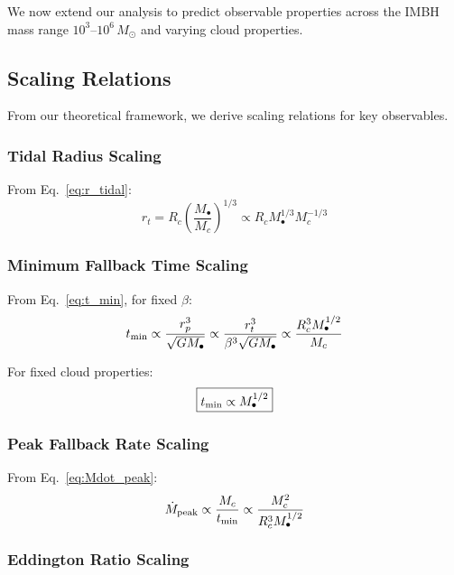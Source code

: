 \documentclass[twocolumn,amsmath,amssymb,prd,superscriptaddress,nofootinbib]{revtex4-2}
\begin{document}
We now extend our analysis to predict observable properties across the IMBH mass range $10^3$--$10^6\,M_\odot$ and varying cloud properties.

\subsection{Scaling Relations}
\label{sec:scaling}

From our theoretical framework, we derive scaling relations for key observables.

\subsubsection{Tidal Radius Scaling}

From Eq.~\eqref{eq:r_tidal}:
\begin{equation}
    r_t = R_c\left(\frac{M_\bullet}{M_c}\right)^{1/3} \propto R_c M_\bullet^{1/3} M_c^{-1/3}
    \label{eq:r_t_scaling}
\end{equation}

\subsubsection{Minimum Fallback Time Scaling}

From Eq.~\eqref{eq:t_min}, for fixed $\beta$:
\begin{equation}
    t_{\rm min} \propto \frac{r_p^3}{\sqrt{GM_\bullet}} \propto \frac{r_t^3}{\beta^3\sqrt{GM_\bullet}} \propto \frac{R_c^3 M_\bullet^{1/2}}{M_c}
    \label{eq:t_min_scaling}
\end{equation}

For fixed cloud properties:
\begin{equation}
    \boxed{t_{\rm min} \propto M_\bullet^{1/2}}
\end{equation}

\subsubsection{Peak Fallback Rate Scaling}

From Eq.~\eqref{eq:Mdot_peak}:
\begin{equation}
    \dot{M}_{\rm peak} \propto \frac{M_c}{t_{\rm min}} \propto \frac{M_c^2}{R_c^3 M_\bullet^{1/2}}
    \label{eq:Mdot_scaling}
\end{equation}

\subsubsection{Eddington Ratio Scaling}
\end{document}
